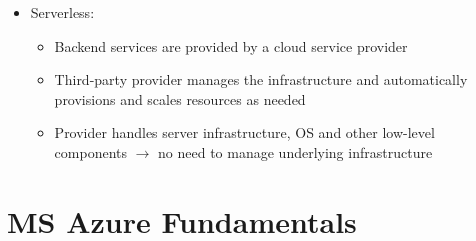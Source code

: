 \documentclass[11pt]{scrartcl}
\begin{document}
\begin{itemize}
\begin{itemize}
	\end{itemize}
	\item Serverless:
	\begin{itemize}
		\item Backend services are provided by a cloud service provider
		\item Third-party provider manages the infrastructure and automatically provisions and scales resources as needed
		\item Provider handles server infrastructure, OS and other low-level components $\to$ no need to manage underlying infrastructure
	\end{itemize}
\end{itemize}


\section*{MS Azure Fundamentals}
\end{document}
